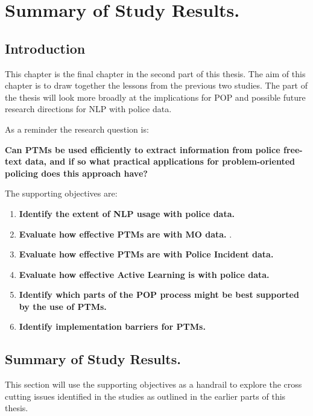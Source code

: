 \chapter{Summary of Study Results.}


\section{Introduction} This chapter is the final chapter in the second part of this thesis. The aim of this chapter is to draw together the lessons from the previous two studies. The part of the thesis will look more broadly at the implications for POP and possible future research directions for NLP with police data.

As a reminder the research question is:

\textbf{Can PTMs be used efficiently to extract information from police free-text data, and if so what practical applications for problem-oriented policing does this approach have?}

The supporting objectives are:
\begin{enumerate}
\item {\bf Identify the extent of NLP usage with police data.} 
\item {\bf Evaluate how effective PTMs are with MO data.} .
\item {\bf Evaluate how effective PTMs are with Police Incident data.} 
\item {\bf Evaluate how effective Active Learning is with police data.}  
\item {\bf Identify which parts of the POP process might be best supported by the use of PTMs.} 
\item {\bf Identify implementation barriers for PTMs.} 
\end{enumerate}

\section{Summary of Study Results.} This section will use the supporting objectives as a handrail to explore the cross cutting issues identified in the studies as outlined in the earlier parts of this thesis.

